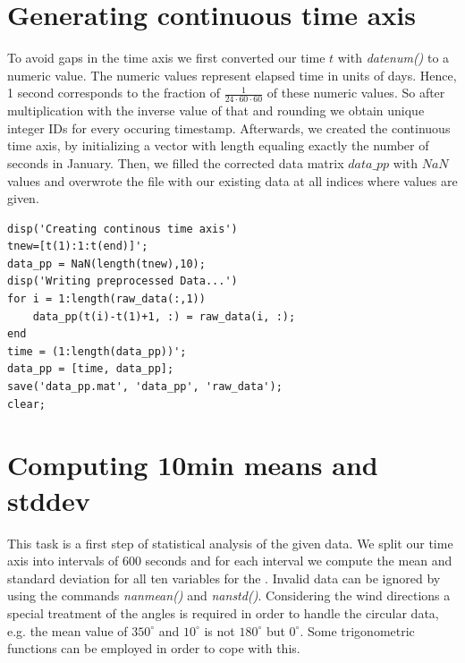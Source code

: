 \documentclass[10pt]{article}
\begin{document}
\section{Generating continuous time axis}
To avoid gaps in the time axis we first converted our time $t$ with \textit{datenum()} to a numeric value. The numeric values represent elapsed time in units of days. Hence, 1 second corresponds to the fraction of  $\frac{1}{24\cdot60\cdot60}$ of these numeric values. So after multiplication with the inverse value of that and rounding we obtain unique integer IDs for every occuring timestamp. 
Afterwards, we created the continuous time axis, by initializing a vector with length equaling exactly the number of seconds in January. 
Then, we filled the corrected data matrix $data\_pp$ with $NaN$ values and overwrote the file with our existing data at all indices where values are given.\\
\begin{lstlisting}
disp('Creating continous time axis')
tnew=[t(1):1:t(end)]';
data_pp = NaN(length(tnew),10);
disp('Writing preprocessed Data...')
for i = 1:length(raw_data(:,1))
    data_pp(t(i)-t(1)+1, :) = raw_data(i, :);
end
time = (1:length(data_pp))';
data_pp = [time, data_pp];
save('data_pp.mat', 'data_pp', 'raw_data');
clear;
\end{lstlisting}

\section{Computing 10min means and stddev}
This task is a first step of statistical analysis of the given data. We split our time axis into intervals of 600 seconds and for each interval we compute the mean and standard deviation for all ten variables for the . Invalid data can be ignored by using the commands \textit{nanmean()} and \textit{nanstd()}. Considering the wind directions a special treatment of the angles is required in order to handle the circular data, e.g. the mean value of $350^{\circ}$ and $10^{\circ}$ is not $180^{\circ}$ but $0^{\circ}$. Some trigonometric functions can be employed in order to cope with this.\\
\end{document}
